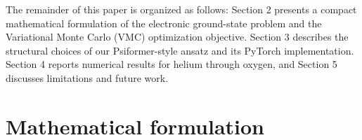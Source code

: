 The remainder of this paper is organized as
follows: Section 2 presents a compact mathematical formulation of the electronic
ground-state problem and the Variational Monte Carlo (VMC) optimization objective.
Section 3 describes the structural choices of our Psiformer-style ansatz and its
PyTorch implementation. Section 4 reports numerical results for helium through oxygen,
and Section 5 discusses limitations and future work.

\section{Mathematical formulation}


